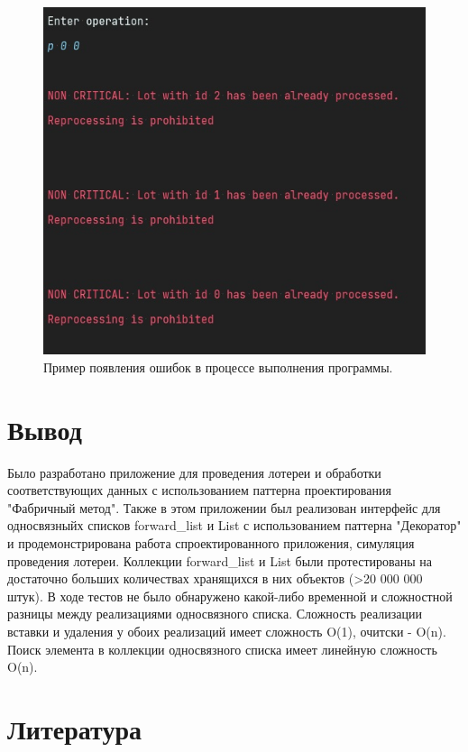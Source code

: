 \documentclass[a4paper,14pt]{article}
\begin{document}
\begin{figure}[H]
  \centering
  \captionsetup{justification=centering,margin=1cm}
  \includegraphics{pictures/11}
  \caption{Пример появления ошибок в процессе выполнения программы.}
\end{figure}
\clearpage

\section{Вывод}
Было разработано приложение для проведения лотереи и обработки соответствующих данных с использованием паттерна проектирования "Фабричный метод". Также в этом приложении был реализован интерфейс для односвязныйх списков forward_list и List с использованием паттерна "Декоратор" и продемонстрирована работа спроектированного приложения, симуляция проведения лотереи.
Коллекции forward_list и List были протестированы на достаточно больших количествах хранящихся в них объектов (>20 000 000 штук). В ходе тестов не было обнаружено какой-либо временной и сложностной разницы между реализациями односвязного списка. Сложность реализации вставки и удаления у обоих реализаций имеет сложность O(1), очитски - O(n). Поиск элемента в коллекции односвязного списка имеет линейную сложность O(n).
\newpage

\section{Литература}
\end{document}
